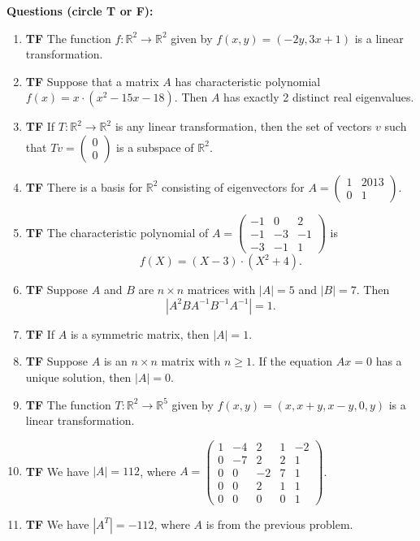 \documentclass[10pt]{article}
\newcommand{\tf}[1]{\item {\bf {\color{blue}\hspace{1em}T\hspace{1em}F}}\hspace{1em} #1}
\begin{document}
{\noindent\bf \color{red} Questions (circle T or F):}
\begin{enumerate}

\tf{The function $f:\mathbb{R}^2\to \mathbb{R}^2$ given by $f(x,y) = (-2y,3x+1)$ is
a linear transformation.}

\tf{Suppose that a matrix $A$ has characteristic polynomial $f(x) = x \cdot (x^{2} - 15x - 18)$.  Then $A$ has exactly 2 distinct real eigenvalues.}

\tf{If $T:\mathbb{R}^2 \to \mathbb{R}^2$ is any linear transformation, then the
set of vectors $v$ such that $Tv=\left(\begin{array}{r}
0 \\
0
\end{array}\right)$ is a subspace of $\mathbb{R}^2$.}

\tf{There is a basis for $\mathbb{R}^2$ consisting of eigenvectors for $A=\left(\begin{array}{rrr}1 & 2013 \\0 & 1\end{array}\right)$.}

\tf{The characteristic polynomial of $A=\left(\begin{array}{rrr}
-1 & 0 & 2 \\
-1 & -3 & -1 \\
-3 & -1 & 1
\end{array}\right)$ is $$f(X)=(X - 3) \cdot (X^{2} + 4).$$}

\tf{Suppose $A$ and $B$ are $n\times n$ matrices with $|A|=5$ and $|B|=7$.
Then $$|A^2BA^{-1}B^{-1}A^{-1}| = 1.$$}

\tf{If $A$ is a symmetric matrix, then $|A|=1$.}

\tf{Suppose $A$ is an $n\times n$ matrix with $n\geq 1$.  If the equation $Ax=0$ has a unique solution, then $|A|=0$.}

\tf{The function $T:\mathbb{R}^2\to \mathbb{R}^5$ given by $f(x,y) = (x,x+y,x-y,0,y)$ is
a linear transformation.}

\tf{We have $|A|=112$, where $A=\left(\begin{array}{rrrrr}
1 & -4 & 2 & 1 & -2 \\
0 & -7 & 2 & 2 & 1 \\
0 & 0 & -2 & 7 & 1 \\
0 & 0 & 2 & 1 & 1 \\
0 & 0 & 0 & 0 & 1
\end{array}\right)$.}

\tf{We have $|A^{T}|=-112$, where $A$ is from the previous problem.}


\end{enumerate}
\end{document}
